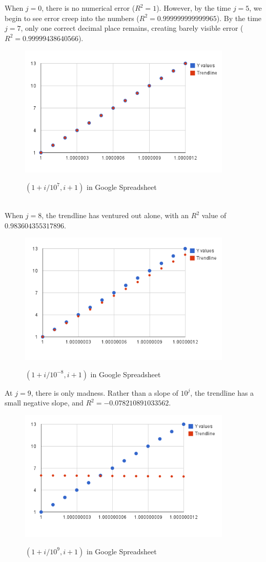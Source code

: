 \documentclass{article}
\begin{document}
\newpage
When $j=0$, there is no numerical error ($R^2=1$).
However, by the time $j=5$, we begin to see error creep into the numbers ($R^2 = 0.999999999999965$).
By the time $j=7$, only one correct decimal place remains,
creating barely visible error ($R^2=0.99999438640566$).\\
\begin{figure}[h!]
  \caption{${(1 + i/10^{7}, i + 1)}$ in Google Spreadsheet}
  \centering
\includegraphics[width=4in]{TRENDj7.png}\\
\end{figure}\\
When $j=8$, the trendline has ventured out alone, with an $R^2$ value of $0.983604355317896$.\\
\begin{figure}[h!]
  \caption{${(1 + i/10^{-8}, i + 1)}$ in Google Spreadsheet}
  \centering
\includegraphics[width=4in]{TRENDj8.png}\\
\end{figure}
\newpage
At $j=9$, there is only madness.  Rather than a slope of $10^{j}$,
the trendline has a small negative slope, and $R^2 =-0.078210891033562$.\\
\begin{figure}[h!]
  \caption{${(1 + i/10^{9}, i + 1)}$ in Google Spreadsheet}
  \centering
\includegraphics[width=4in]{TRENDj9.png}\\
\end{figure}\\
\end{document}
